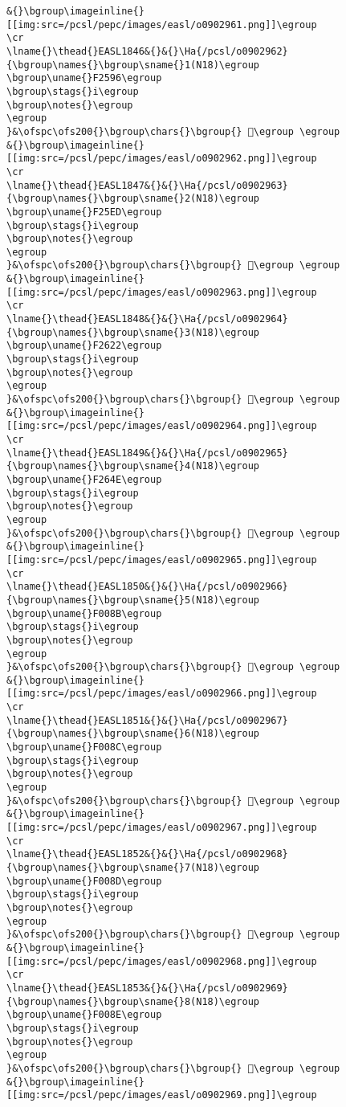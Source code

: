 \begin{verbatim}
&{}\bgroup\imageinline{}[[img:src=/pcsl/pepc/images/easl/o0902961.png]]\egroup
\cr
\lname{}\thead{}EASL1846&{}&{}\Ha{/pcsl/o0902962}{\bgroup\names{}\bgroup\sname{}1(N18)\egroup
\bgroup\uname{}F2596\egroup
\bgroup\stags{}i\egroup
\bgroup\notes{}\egroup
\egroup
}&\ofspc\ofs200{}\bgroup\chars{}\bgroup{} 󲖖\egroup \egroup
&{}\bgroup\imageinline{}[[img:src=/pcsl/pepc/images/easl/o0902962.png]]\egroup
\cr
\lname{}\thead{}EASL1847&{}&{}\Ha{/pcsl/o0902963}{\bgroup\names{}\bgroup\sname{}2(N18)\egroup
\bgroup\uname{}F25ED\egroup
\bgroup\stags{}i\egroup
\bgroup\notes{}\egroup
\egroup
}&\ofspc\ofs200{}\bgroup\chars{}\bgroup{} 󲗭\egroup \egroup
&{}\bgroup\imageinline{}[[img:src=/pcsl/pepc/images/easl/o0902963.png]]\egroup
\cr
\lname{}\thead{}EASL1848&{}&{}\Ha{/pcsl/o0902964}{\bgroup\names{}\bgroup\sname{}3(N18)\egroup
\bgroup\uname{}F2622\egroup
\bgroup\stags{}i\egroup
\bgroup\notes{}\egroup
\egroup
}&\ofspc\ofs200{}\bgroup\chars{}\bgroup{} 󲘢\egroup \egroup
&{}\bgroup\imageinline{}[[img:src=/pcsl/pepc/images/easl/o0902964.png]]\egroup
\cr
\lname{}\thead{}EASL1849&{}&{}\Ha{/pcsl/o0902965}{\bgroup\names{}\bgroup\sname{}4(N18)\egroup
\bgroup\uname{}F264E\egroup
\bgroup\stags{}i\egroup
\bgroup\notes{}\egroup
\egroup
}&\ofspc\ofs200{}\bgroup\chars{}\bgroup{} 󲙎\egroup \egroup
&{}\bgroup\imageinline{}[[img:src=/pcsl/pepc/images/easl/o0902965.png]]\egroup
\cr
\lname{}\thead{}EASL1850&{}&{}\Ha{/pcsl/o0902966}{\bgroup\names{}\bgroup\sname{}5(N18)\egroup
\bgroup\uname{}F008B\egroup
\bgroup\stags{}i\egroup
\bgroup\notes{}\egroup
\egroup
}&\ofspc\ofs200{}\bgroup\chars{}\bgroup{} 󰂋\egroup \egroup
&{}\bgroup\imageinline{}[[img:src=/pcsl/pepc/images/easl/o0902966.png]]\egroup
\cr
\lname{}\thead{}EASL1851&{}&{}\Ha{/pcsl/o0902967}{\bgroup\names{}\bgroup\sname{}6(N18)\egroup
\bgroup\uname{}F008C\egroup
\bgroup\stags{}i\egroup
\bgroup\notes{}\egroup
\egroup
}&\ofspc\ofs200{}\bgroup\chars{}\bgroup{} 󰂌\egroup \egroup
&{}\bgroup\imageinline{}[[img:src=/pcsl/pepc/images/easl/o0902967.png]]\egroup
\cr
\lname{}\thead{}EASL1852&{}&{}\Ha{/pcsl/o0902968}{\bgroup\names{}\bgroup\sname{}7(N18)\egroup
\bgroup\uname{}F008D\egroup
\bgroup\stags{}i\egroup
\bgroup\notes{}\egroup
\egroup
}&\ofspc\ofs200{}\bgroup\chars{}\bgroup{} 󰂍\egroup \egroup
&{}\bgroup\imageinline{}[[img:src=/pcsl/pepc/images/easl/o0902968.png]]\egroup
\cr
\lname{}\thead{}EASL1853&{}&{}\Ha{/pcsl/o0902969}{\bgroup\names{}\bgroup\sname{}8(N18)\egroup
\bgroup\uname{}F008E\egroup
\bgroup\stags{}i\egroup
\bgroup\notes{}\egroup
\egroup
}&\ofspc\ofs200{}\bgroup\chars{}\bgroup{} 󰂎\egroup \egroup
&{}\bgroup\imageinline{}[[img:src=/pcsl/pepc/images/easl/o0902969.png]]\egroup

\end{verbatim}
